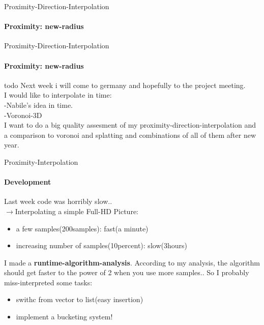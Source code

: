 \begin{frame}{Proximity-Direction-Interpolation}
\framesubtitle{Proximity: new-radius}
\end{frame}

\begin{frame}{Proximity-Direction-Interpolation}
\framesubtitle{Proximity: new-radius}
\end{frame}

\begin{frame}{todo}
Next week i will come to germany and hopefully to the project meeting.\\
I would like to interpolate in time: \\
-Nabile's idea in time.\\
-Voronoi-3D\\
I want to do a big quality assesment of my proximity-direction-interpolation and a comparison to voronoi and splatting and combinations of all of them after new year.\\
\end{frame}



\begin{frame}{Proximity-Interpolation}
\framesubtitle{Development}
Last week code was horribly slow.. \\
\(\rightarrow\)Interpolating a simple Full-HD Picture:\\
\begin{itemize}
\item a few samples(200samples): fast(a minute)
\item increasing number of samples(10percent): slow(3hours)
\end{itemize}

I made a \textbf{runtime-algorithm-analysis}. According to my analysis, the algorithm should get
faster to the power of 2 when you use more samples.. So I probably miss-interpreted
some tasks:\\
\begin{itemize}
\item swithc from vector to list(easy insertion)
\item implement a bucketing system!
\end{itemize}
\end{frame}

